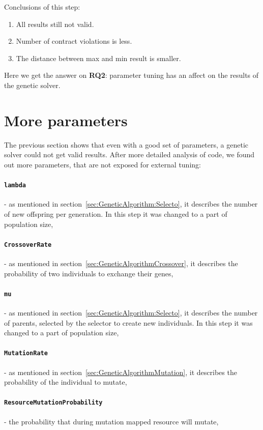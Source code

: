 Conclusions of this step:
\begin{enumerate}
	\item All results still not valid.
	\item Number of contract violations is less.
	\item The distance between max and min result is smaller.
\end{enumerate}
Here we get the answer on \textbf{RQ2}: parameter tuning has an affect on the results of the genetic solver.

\section{More parameters}
The previous section shows that even with a good set of parameters, a genetic solver could not get valid results.
After more detailed analysis of code, we found out more parameters, that are not exposed for external tuning:
	 \paragraph{\texttt{lambda}} - as mentioned in section~\ref{sec:GeneticAlgorithm:Selecto}, it describes the number of new offspring per generation. In this step it was changed to a part of population size,
	 \paragraph{\texttt{CrossoverRate}} - as mentioned in section~\ref{sec:GeneticAlgorithmCrossover}, it describes the probability of two individuals to exchange their genes,
	 \paragraph{\texttt{mu}} - as mentioned in section~\ref{sec:GeneticAlgorithm:Selecto}, it describes the number of parents, selected by the selector to create new individuals. In this step it was changed to a part of population size,
	 \paragraph{\texttt{MutationRate}} - as mentioned in section~\ref{sec:GeneticAlgorithmMutation}, it describes the probability of the individual to mutate,
	 \paragraph{\texttt{ResourceMutationProbability}} - the probability that during mutation mapped resource will mutate,
